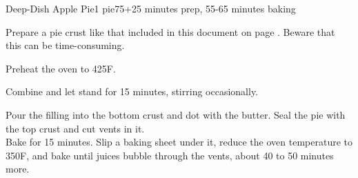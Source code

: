 \documentclass[../Cookbook.tex]{subfiles}
\begin{document}
\begin{recipe}{Deep-Dish Apple Pie}{1 pie}{75+25 minutes prep, 55-65 minutes baking}

	Prepare a pie crust like that included in this document on page \pageref{PieCrust}. Beware that this can be time-consuming.

	\newstep
	Preheat the oven to 425\0F.

	Combine and let stand for 15 minutes, stirring occasionally.

	Pour the filling into the bottom crust and dot with the butter. Seal the pie with the top crust and cut vents in it.\\
	Bake for 15 minutes. Slip a baking sheet under it, reduce the oven temperature to 350\0F, and bake until juices bubble through the vents, about 40 to 50 minutes more.

\end{recipe}
\end{document}
